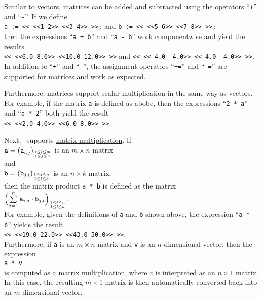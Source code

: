 Similar to vectors, matrices can be added and subtracted using the operators ``\texttt{+}'' and
``\texttt{-}''.   If we define
\\[0.2cm]
\hspace*{1.3cm}
\texttt{a := << <<1 2>> <<3 4>> >>;} \quad and \quad \texttt{b := << <<5 6>> <<7 8>> >>;}   
\\[0.2cm]
then the expressions ``\texttt{a + b}'' and ``\texttt{a - b}'' work componentwise and yield the
results 
\\[0.2cm]
\hspace*{1.3cm}
\texttt{<< <<6.0 8.0>> <<10.0 12.0>> >>} \quad and \quad 
\texttt{<< <<-4.0 -4.0>> <<-4.0 -4.0>> >>}.
\\[0.2cm]
In addition to ``\texttt{+}'' and ``\texttt{-}'', the assignment operators ``\texttt{+=}'' and
``\texttt{-=}'' are supported for matrices and work as expected.

Furthermore, matrices support scalar multiplication in the same way as vectors.  For example, if the
matrix \texttt{a} is defined as abobe, then the expressions 
``\texttt{2 * a}'' and ``\texttt{a * 2}'' both yield the result
\\[0.2cm]
\hspace*{1.3cm}
\texttt{<< <<2.0 4.0>> <<6.0 8.0>> >>}.
\vspace*{0.2cm} 

Next,
\setlx\ supports \href{http://en.wikipedia.org/wiki/Matrix_multiplication}{matrix multiplication}.
If
\\[0.2cm]
\hspace*{1.3cm}
 $\texttt{a} = (\mathtt{a}_{i,j})_{1 \leq i \leq m \atop 1 \leq j \leq n}$ \quad is an $m \times n$ matrix 
\\
and
\\
\hspace*{1.3cm}
$\texttt{b} = (\mathtt{b}_{j,l})_{1 \leq j \leq n \atop 1 \leq l \leq k}$ \quad is an $n \times k$ matrix, 
\\[0.2cm]
then the matrix product \texttt{a * b} is defined as the matrix
\\[0.2cm]
\hspace*{1.3cm}
$\Bigl(\sum\limits_{j=1}^n \texttt{a}_{i,j}\cdot \texttt{b}_{j,l}\Bigr)_{1 \leq i \leq n \atop 1 \leq l \leq k}$.
\\[0.2cm]
For example, given the definitions of
\texttt{a} and \texttt{b} shown above,  the expression ``\texttt{a * b}'' yields the result
\\[0.2cm]
\hspace*{1.3cm}
\texttt{<< <<19.0 22.0>> <<43.0 50.0>> >>}.
\\[0.2cm]
Furthermore, if \texttt{a} is an $m \times n$ matrix and \texttt{v} is an $n$ dimensional vector,
then the expression 
\\[0.2cm]
\hspace*{1.3cm}
\texttt{a * v}
\\[0.2cm]
is computed as a matrix multiplication, where $v$ is interpreted as an $n \times 1$ matrix.  In
this case, the resulting $m \times 1$ matrix is then automatically converted back into an $m$ dimensional vector.

